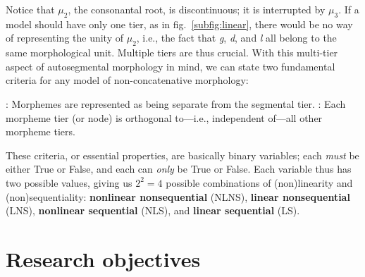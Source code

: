Notice that $\mu_2$, the consonantal root, is discontinuous; it is
interrupted by $\mu_3$. If a model should have only one tier, as in
fig.~\ref{subfig:linear}, there would be no way of representing the
unity of $\mu_2$, i.e., the fact that \textit{g}, \textit{d}, and \textit{l}
all belong to the same morphological unit. Multiple tiers are thus crucial. With this multi-tier aspect of
autosegmental morphology in mind, we can state two fundamental criteria for any
model of non-concatenative morphology:

\begin{exe}  \ex \label{ex:properties}\begin{xlist}
	: Morphemes are represented as being separate from the segmental tier.
	: Each morpheme tier (or node) is orthogonal to---i.e., independent of---all other morpheme tiers.
	\end{xlist}
\end{exe}
These criteria, or essential properties,
are basically binary variables; each \emph{must} be either True or False, and each can \emph{only} be True or False.  Each variable thus has two possible values,
giving us $2^2 = 4$ possible combinations of (non)linearity and (non)sequentiality: 
\textbf{nonlinear nonsequential} (NLNS), \textbf{linear nonsequential} (LNS), 
\textbf{nonlinear sequential} (NLS), and \textbf{linear sequential} (LS).


\section{Research objectives}
